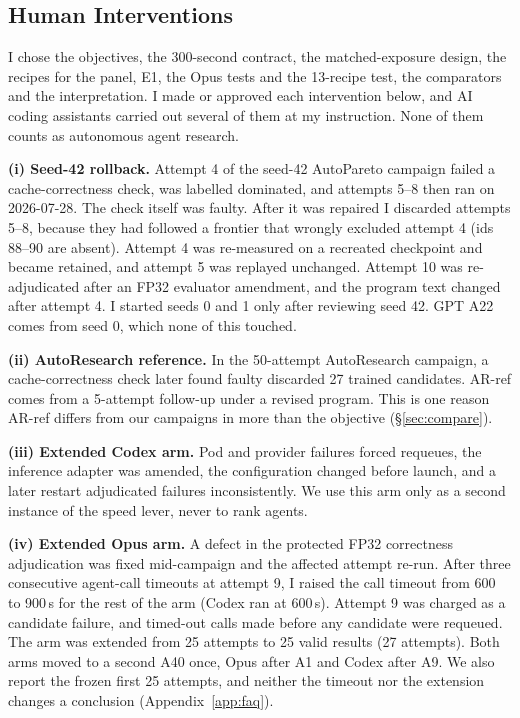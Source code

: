 \documentclass{article}
\newif\ifshowhumanmarkers \showhumanmarkersfalse
\newcommand{\humantag}[1]{{\color{humanframe}\sffamily\scriptsize\bfseries HUMAN AUTHOR MUST REWRITE/VERIFY [#1]}\ }
\newcommand{\humanauthor}[2][]{\ifshowhumanmarkers\begin{humanbox}\humantag{#1}#2\end{humanbox}\else #2\par\fi}
\begin{document}
\subsection{Human Interventions}\label{sec:interventions}
\humanauthor[P2-06 r6]{ I chose the objectives, the 300-second contract, the matched-exposure design, the recipes for the panel, E1, the Opus tests and the 13-recipe test, the comparators and the interpretation. I made or approved each intervention below, and AI coding assistants carried out several of them at my instruction. None of them counts as autonomous agent research.

\looseness=-1 \textbf{(i) Seed-42 rollback.} Attempt 4 of the seed-42 AutoPareto campaign failed a cache-correctness check, was labelled dominated, and attempts 5--8 then ran on 2026-07-28. The check itself was faulty. After it was repaired I discarded attempts 5--8, because they had followed a frontier that wrongly excluded attempt 4 (ids 88--90 are absent). Attempt 4 was re-measured on a recreated checkpoint and became retained, and attempt 5 was replayed unchanged. Attempt 10 was re-adjudicated after an FP32 evaluator amendment, and the program text changed after attempt 4. I started seeds 0 and 1 only after reviewing seed 42. GPT A22 comes from seed 0, which none of this touched.

\looseness=-1 \textbf{(ii) AutoResearch reference.} In the 50-attempt AutoResearch campaign, a cache-correctness check later found faulty discarded 27 trained candidates. AR-ref comes from a 5-attempt follow-up under a revised program. This is one reason AR-ref differs from our campaigns in more than the objective (\S\ref{sec:compare}).

\looseness=-1 \textbf{(iii) Extended Codex arm.} Pod and provider failures forced requeues, the inference adapter was amended, the configuration changed before launch, and a later restart adjudicated failures inconsistently. We use this arm only as a second instance of the speed lever, never to rank agents.

\looseness=-1 \textbf{(iv) Extended Opus arm.} A defect in the protected FP32 correctness adjudication was fixed mid-campaign and the affected attempt re-run. After three consecutive agent-call timeouts at attempt 9, I raised the call timeout from 600 to 900\,s for the rest of the arm (Codex ran at 600\,s). Attempt 9 was charged as a candidate failure, and timed-out calls made before any candidate were requeued. The arm was extended from 25 attempts to 25 valid results (27 attempts). Both arms moved to a second A40 once, Opus after A1 and Codex after A9. We also report the frozen first 25 attempts, and neither the timeout nor the extension changes a conclusion (Appendix~\ref{app:faq}).

}
\end{document}
